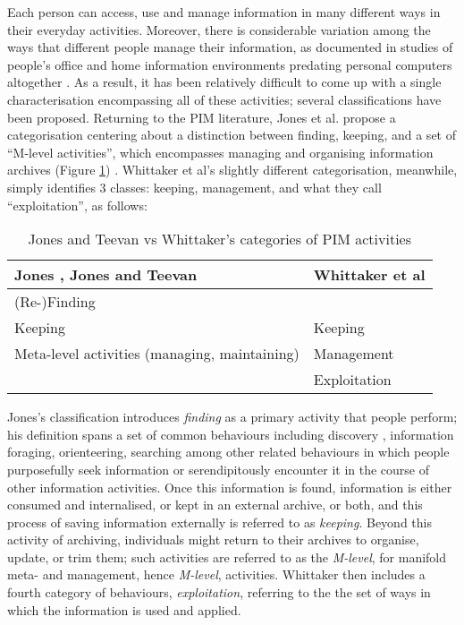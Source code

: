 \documentclass[graybox]{svmult}
\begin{document}
Each person can access, use and manage information in many different ways in their everyday activities.  Moreover, there is considerable variation among the ways that different people manage their information, as documented in studies of people's office and home information environments predating personal computers altogether \cite{malone1983people}.  As a result, it has been relatively difficult to come up with a single characterisation encompassing all of these activities; several classifications have been proposed.  Returning to the PIM literature, Jones et al. propose a categorisation centering about a distinction between finding, keeping, and a set of ``M-level activities'', which encompasses managing and organising information archives (Figure \ref{fig:pimactivities}) \cite{kftf}. Whittaker et al's slightly different categorisation, meanwhile, simply identifies 3 classes: keeping, management, and what they call ``exploitation'', as follows:

\begin{table}
\begin{center}
\begin{tabular}{p{4.5cm} | p{4.5cm}} 
Jones \cite{jones}, Jones and Teevan \cite{teevan2006personal}& Whittaker et al \cite{whittaker2011personal}\\
\hline
(Re-)Finding &  \\
Keeping & Keeping \\
Meta-level activities (managing, maintaining) & Management \\
 & Exploitation \\
\end{tabular}
\caption{Jones and Teevan vs Whittaker's categories of PIM activities}
\label{fig:pimactivities}
\end{center}
\end{table}

Jones's classification introduces \emph{finding} as a primary activity that people perform; his definition spans a set of common behaviours including discovery \cite{}, information foraging\cite{}, orienteering\cite{}, searching\cite{} among other related behaviours in which people purposefully seek information or serendipitously encounter it in the course of other information activities.  Once this information is found, information is either consumed and internalised, or kept in an external archive, or both, and this process of saving information externally is referred to as \emph{keeping}.  Beyond this activity of archiving, individuals might return to their archives to organise, update, or trim them; such activities are referred to as the \emph{M-level}, for manifold meta- and management, hence \emph{M-level}, activities.  Whittaker then includes a fourth category of behaviours, \emph{exploitation}, referring to the the set of ways in which the information is used and applied.
\end{document}
